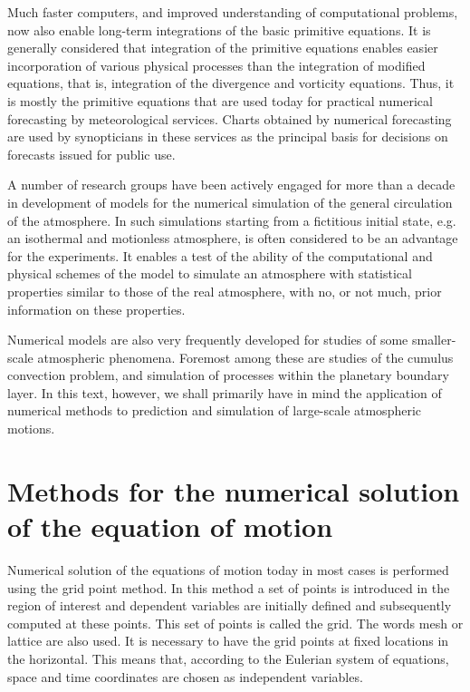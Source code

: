 Much faster computers, and improved understanding of computational problems, now also enable long-term integrations of the basic primitive equations. It is generally considered that integration of the primitive equations enables easier incorporation of various physical processes than the integration of modified equations, that is, integration of the divergence and vorticity equations. Thus, it is mostly the primitive equations that are used today for practical numerical forecasting by meteorological services. Charts obtained by numerical forecasting are used by synopticians in these services as the principal basis for decisions on forecasts issued for public use.

A number of research groups have been actively engaged for more than a decade in development of models for the numerical simulation of the general circulation of the atmosphere. In such simulations starting from a fictitious initial state, e.g. an isothermal and motionless atmosphere, is often considered to be an advantage for the experiments. It enables a test of the ability of the computational and physical schemes of the model to simulate an atmosphere with statistical properties similar to those of the real atmosphere, with no, or not much, prior information on these properties.

Numerical models are also very frequently developed for studies of some smaller-scale atmospheric phenomena. Foremost among these are studies of the cumulus convection problem, and simulation of processes within the planetary boundary layer. In this text, however, we shall primarily have in mind the application of numerical methods to prediction and simulation of large-scale atmospheric motions.



\section{Methods for the numerical solution of the equation of motion}
Numerical solution of the equations of motion today in most cases is performed using the grid point method. In this method a set of points is introduced in the region of interest and dependent variables are initially defined and subsequently computed at these points. This set of points is called the grid. The words mesh or lattice are also used. It is necessary to have the grid points at fixed locations in the horizontal. This means that, according to the Eulerian system of equations, space and time coordinates are chosen as independent variables.

